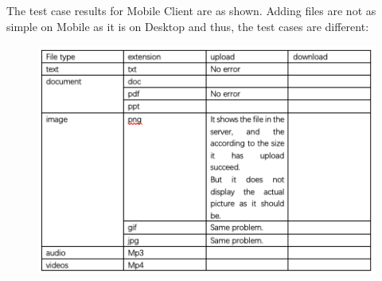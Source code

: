 \begin{figure}[H]
\centering
{}%
\end{figure}

The test case results for Mobile Client are as shown. Adding files are not as simple on Mobile as it is on Desktop and thus, the test cases are different:\newline

\begin{figure}[H]
\centering
\includegraphics[scale=0.5]{mobiletest}
\end{figure}

\newline